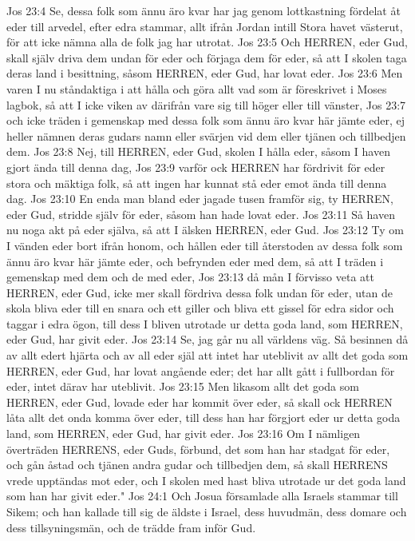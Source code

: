 Jos 23:4  Se, dessa folk som ännu äro kvar har jag genom lottkastning fördelat åt eder till arvedel, efter edra stammar, allt ifrån Jordan intill Stora havet västerut, för att icke nämna alla de folk jag har utrotat.
Jos 23:5  Och HERREN, eder Gud, skall själv driva dem undan för eder och förjaga dem för eder, så att I skolen taga deras land i besittning, såsom HERREN, eder Gud, har lovat eder.
Jos 23:6  Men varen I nu ståndaktiga i att hålla och göra allt vad som är föreskrivet i Moses lagbok, så att I icke viken av därifrån vare sig till höger eller till vänster,
Jos 23:7  och icke träden i gemenskap med dessa folk som ännu äro kvar här jämte eder, ej heller nämnen deras gudars namn eller svärjen vid dem eller tjänen och tillbedjen dem.
Jos 23:8  Nej, till HERREN, eder Gud, skolen I hålla eder, såsom I haven gjort ända till denna dag,
Jos 23:9  varför ock HERREN har fördrivit för eder stora och mäktiga folk, så att ingen har kunnat stå eder emot ända till denna dag.
Jos 23:10  En enda man bland eder jagade tusen framför sig, ty HERREN, eder Gud, stridde själv för eder, såsom han hade lovat eder.
Jos 23:11  Så haven nu noga akt på eder själva, så att I älsken HERREN, eder Gud.
Jos 23:12  Ty om I vänden eder bort ifrån honom, och hållen eder till återstoden av dessa folk som ännu äro kvar här jämte eder, och befrynden eder med dem, så att I träden i gemenskap med dem och de med eder,
Jos 23:13  då mån I förvisso veta att HERREN, eder Gud, icke mer skall fördriva dessa folk undan för eder, utan de skola bliva eder till en snara och ett giller och bliva ett gissel för edra sidor och taggar i edra ögon, till dess I bliven utrotade ur detta goda land, som HERREN, eder Gud, har givit eder.
Jos 23:14  Se, jag går nu all världens väg. Så besinnen då av allt edert hjärta och av all eder själ att intet har uteblivit av allt det goda som HERREN, eder Gud, har lovat angående eder; det har allt gått i fullbordan för eder, intet därav har uteblivit.
Jos 23:15  Men likasom allt det goda som HERREN, eder Gud, lovade eder har kommit över eder, så skall ock HERREN låta allt det onda komma över eder, till dess han har förgjort eder ur detta goda land, som HERREN, eder Gud, har givit eder.
Jos 23:16  Om I nämligen överträden HERRENS, eder Guds, förbund, det som han har stadgat för eder, och gån åstad och tjänen andra gudar och tillbedjen dem, så skall HERRENS vrede upptändas mot eder, och I skolen med hast bliva utrotade ur det goda land som han har givit eder."
Jos 24:1  Och Josua församlade alla Israels stammar till Sikem; och han kallade till sig de äldste i Israel, dess huvudmän, dess domare och dess tillsyningsmän, och de trädde fram inför Gud.
